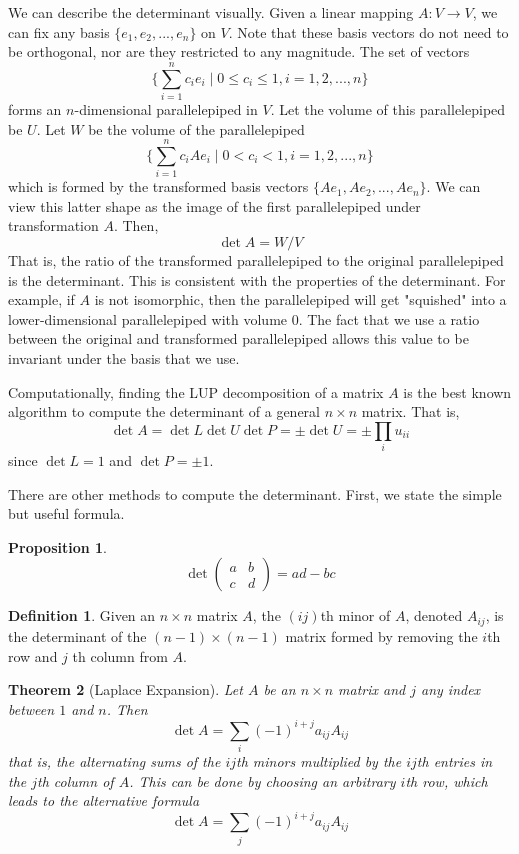 \documentclass{article}
\newtheorem{theorem}{Theorem}[section]
\newtheorem{proposition}[theorem]{Proposition}
\theoremstyle{remark}
\theoremstyle{definition}
\newtheorem{definition}{Definition}[section]
\begin{document}
We can describe the determinant visually. Given a linear mapping $A: V \longrightarrow V$, we can fix any basis $\{e_1, e_2, ..., e_n\}$ on $V$. Note that these basis vectors do not need to be orthogonal, nor are they restricted to any magnitude. The set of vectors 
\[\Big\{ \sum_{i=1}^n c_i e_i \; | \; 0 \leq c_i \leq 1, i = 1, 2, ..., n\Big\}\]
forms an $n$-dimensional parallelepiped in $V$. Let the volume of this parallelepiped be $U$. Let $W$ be the volume of the parallelepiped 
\[\Big\{ \sum_{i=1}^n c_i A e_i \; | \; 0<c_i<1, i = 1, 2, ..., n\Big\}\]
which is formed by the transformed basis vectors $\{Ae_1, Ae_2, ..., Ae_n\}$. We can view this latter shape as the image of the first parallelepiped under transformation $A$. Then, 
\[ \det{A} = W / V \]
That is, the ratio of the transformed parallelepiped to the original parallelepiped is the determinant. This is consistent with the properties of the determinant. For example, if $A$ is not isomorphic, then the parallelepiped will get "squished" into a lower-dimensional parallelepiped with volume $0$. The fact that we use a ratio between the original and transformed parallelepiped allows this value to be invariant under the basis that we use. 

Computationally, finding the LUP decomposition of a matrix $A$ is the best known algorithm to compute the determinant of a general $n \times n$ matrix. That is, 
\[ \det{A} = \det{L} \det{U} \det{P} = \pm \det{U} = \pm \prod_i u_{i i}\]
since $\det{L} = 1$ and $\det{P} = \pm 1$. 

There are other methods to compute the determinant. First, we state the simple but useful formula.

\begin{proposition}
\[\det{\begin{pmatrix}
a&b\\c&d 
\end{pmatrix}} = a d - b c\] 
\end{proposition}

\begin{definition}
Given an $n \times n$ matrix $A$, the $(i j)$th minor of $A$, denoted $A_{i j}$, is the determinant of the $(n-1) \times (n-1)$ matrix formed by removing the $i$th row and $j$ th column from $A$. 
\end{definition}

\begin{theorem}[Laplace Expansion]
Let $A$ be an $n \times n$ matrix and $j$ any index between $1$ and $n$. Then
\[\det{A} = \sum_i (-1)^{i + j} a_{i j} A_{i j}\]
that is, the alternating sums of the $ij$th minors multiplied by the $ij$th entries in the $j$th column of $A$. This can be done by choosing an arbitrary $i$th row, which leads to the alternative formula 
\[\det{A} = \sum_j (-1)^{i + j} a_{i j} A_{i j} \]
\end{theorem}
\end{document}
